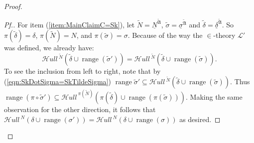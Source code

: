 \documentclass{amsart}
\theoremstyle{definition}
\theoremstyle{remark}
\newcommand{\N}{{\overline{N}}}
\DeclareMathOperator{\ran}{range}
\newcommand{\SH}{\mathcal{H}\textit{ull} \,}
\newcommand{\sk}[3]{\SH^{#1}( {#2} \cup {\ran(#3)} ) }
\newcommand{\Sk}[3]{\SH^{#1}( {#2} \cup {#3} ) }
\begin{document}
\begin{proof}
\begin{proof}[Pf.]
For item (\ref{item:MainClaimC=Sk}), let $\widetilde N = \underline N^{\widetilde{\mathfrak A}}$, $\widetilde \sigma = \underline \sigma^{\widetilde{\mathfrak A}}$ and $\widetilde \delta = \underline{\delta}^{\widetilde{\mathfrak A}}$. So $\pi(\widetilde \delta)= \delta$, $\pi(\widetilde N)=N$, and $\pi(\widetilde \sigma)=\sigma$. Because of the way the $\in$-theory $\mathcal L'$ was defined, we already have: 
\begin{equation} \tag{$\star$} \label{eqn:SkDotSigma=SkTildeSigma} \sk{\widetilde N}{\widetilde \delta}{\widetilde \sigma'} = \sk{\widetilde N}{\widetilde \delta}{\widetilde \sigma}. \end{equation} To see the inclusion from left to right, note that by (\ref{eqn:SkDotSigma=SkTildeSigma}) $\ran{\widetilde \sigma'} \subseteq \sk{\widetilde N}{\widetilde \delta}{\widetilde \sigma}$. Thus 
	$\ran(\pi \circ \widetilde \sigma') \subseteq \sk{\pi(\widetilde N)}{\pi(\widetilde \delta)}{\pi(\widetilde\sigma)}.$
Making the same observation for the other direction, it follows that
$\sk{N}{\delta}{\sigma'} = \sk{N}{\delta}{\sigma}$ as desired.

\end{proof}
\end{proof}
\end{document}
